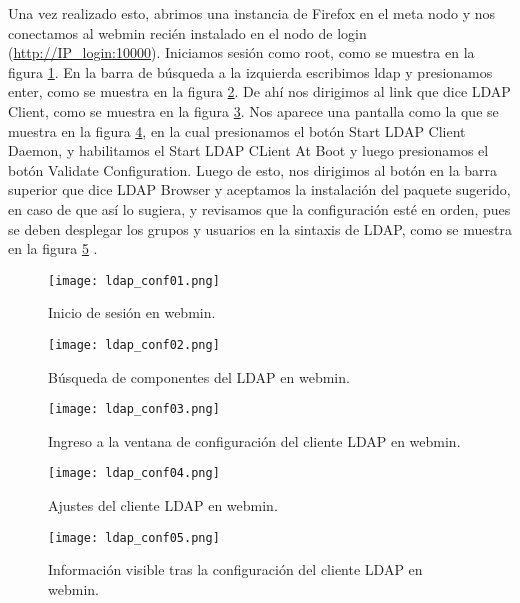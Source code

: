 Una vez realizado esto, abrimos una instancia de Firefox en el meta nodo y nos conectamos al webmin recién instalado en el nodo de login  (\url{http://IP_login:10000}). Iniciamos sesión como root, como se muestra en la figura \ref{fig:ldapconf:01}. En la barra de búsqueda a la izquierda escribimos ldap y presionamos enter, como se muestra en la figura \ref{fig:ldapconf:02}. De ahí nos dirigimos al link que dice LDAP Client, como se muestra en la figura \ref{fig:ldapconf:03}. Nos aparece una pantalla como la que se muestra en la figura \ref{fig:ldapconf:04}, en la cual presionamos el botón Start LDAP Client Daemon, y habilitamos el Start LDAP CLient At Boot y luego presionamos el botón Validate Configuration. Luego de esto, nos dirigimos al botón en la barra superior que dice LDAP Browser y aceptamos la instalación del paquete sugerido, en caso de que así lo sugiera, y revisamos que la configuración esté en orden, pues se deben desplegar los grupos y usuarios en la sintaxis de LDAP, como se muestra en la figura \ref{fig:ldapconf:05} \cite{webmininstall}.
\begin{figure}[H]
\centering
\texttt{[image: ldap\_conf01.png]}
\caption{Inicio de sesión en webmin.}
\label{fig:ldapconf:01}
\end{figure}
\begin{figure}[H]
\centering
\texttt{[image: ldap\_conf02.png]}
\caption{Búsqueda de componentes del LDAP en webmin.}
\label{fig:ldapconf:02}
\end{figure}
\begin{figure}[H]
\centering
\texttt{[image: ldap\_conf03.png]}
\caption{Ingreso a la ventana de configuración del cliente LDAP en webmin.}
\label{fig:ldapconf:03}
\end{figure}
\begin{figure}[H]
\centering
\texttt{[image: ldap\_conf04.png]}
\caption{Ajustes del cliente LDAP en webmin.}
\label{fig:ldapconf:04}
\end{figure}
\begin{figure}[H]
\centering
\texttt{[image: ldap\_conf05.png]}
\caption{Información visible tras la configuración del cliente LDAP en webmin.}
\label{fig:ldapconf:05}
\end{figure}

